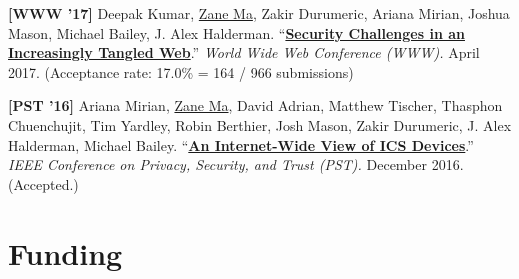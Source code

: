 \documentclass[10pt,singlecolumn]{article} %
\begin{document}
\begin{etaremune}

\item \textbf{[WWW '17]}
Deepak Kumar, \underline{Zane Ma}, Zakir Durumeric, Ariana Mirian, Joshua Mason, Michael Bailey, J. Alex Halderman.
``\textbf{\href{https://zanema.com/papers/www17_tangled.pdf}{Security Challenges in an Increasingly Tangled Web}}.''
\emph{World Wide Web Conference (WWW).} April 2017.
(Acceptance rate: 17.0\% = 164 / 966 submissions)
\vspace{6pt}


\item \textbf{[PST '16]}
Ariana Mirian, \underline{Zane Ma}, David Adrian, Matthew Tischer, Thasphon Chuenchujit, Tim Yardley, Robin Berthier, Josh Mason, Zakir Durumeric, J. Alex Halderman, Michael Bailey.
``\textbf{\href{https://zanema.com/papers/pst16_ics.pdf}{An Internet-Wide View of ICS Devices}}.''
\emph{IEEE Conference on Privacy, Security, and Trust (PST).} December 2016. (Accepted.)
\vspace{6pt}

\end{etaremune}


\section{Funding}
\end{document}
